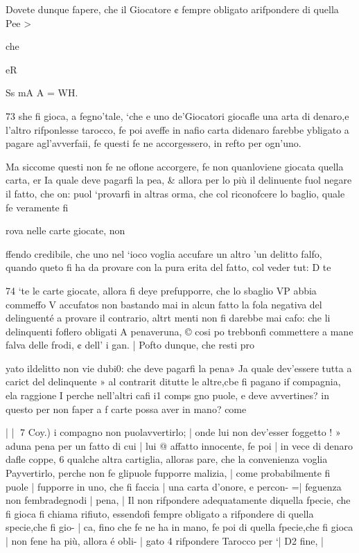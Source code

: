 \documentclass[12pt,a6paper]{article}
\begin{document}
Dovete dunque fapere, che
il Giocatore ¢ fempre obligato
arifpondere di quella Pee >

che

eR

Ss mA A = WH.

 
 

73
she fi gioca, a fegno'tale, ‘che
e uno de’Giocatori giocafle una
arta di denaro,e l’altro rifponlesse tarocco, fe poi aveffe in
nafio carta didenaro farebbe
ybligato a pagare agl’avverfaii, fe questi fe ne accorgessero,
in refto per ogn’uno.

Ma siccome questi non fe ne
oflone accorgere, fe non quanloviene giocata quella carta,
er Ia quale deve pagarfi la pea, & allora per lo più il delinuente fuol negare il fatto, che
on: puol ‘provarfi in altras
orma, che col riconofcere lo
baglio, quale fe veramente fi

rova nelle carte giocate, non

ffendo credibile, che uno nel
‘ioco voglia accufare un altro
’un delitto falfo, quando queto fi ha da provare con la pura
erita del fatto, col veder tut:
D te
 

 

 

 

74
‘te le carte giocate, allora fi deye prefupporre, che lo sbaglio
VP abbia commeffo V accufatos
non bastando mai in alcun fatto
la fola negativa del delinguenté
a provare il contrario, altrt
menti non fi darebbe mai cafo:
che li delinquenti foflero obligati A penaveruna, © cosi po
trebbonfi commettere a mane
falva delle frodi, ¢ dell’ i
gan. |
Pofto dunque, che resti pro

yato ildelitto non vie dubi0:
che deve pagarfi la pena» Ja
quale dev'essere tutta a carict
del delinquente » al contrarit
ditutte le altre,cbe fi pagano if
compagnia, ela raggione I
perche nell’altri cafi i1 comps
gno puole, e deve avvertines?
in questo per non faper a f
carte possa aver in mano?
come

 

| |
7
Coy.) i
compagno non puolavvertirlo; |
onde lui non dev’esser foggetto !
» aduna pena per un fatto di cui |
lui @ affatto innocente, fe poi |
in vece di denaro dafle coppe, 6
qualche altra cartiglia, alloras
pare, che la convenienza voglia Payvertirlo, perche non
fe glipuole fupporre malizia, |
come probabilmente fi puole |
fupporre in uno, che fi faccia |
una carta d’onore, e percon- =|
feguenza non fembradegnodi |
pena, |
Il non rifpondere adequatamente diquella fpecie, che fi
gioca fi chiama rifiuto, essendofi fempre obligato a rifpondere di quella specie,che fi gio- |
ca, fino che fe ne ha in mano, fe
poi di quella fpecie,che fi gioca |
non fene ha più, allora é obli- |
gato 4 rifpondere Tarocco per ‘|
D2 fine, |
\end{document}
